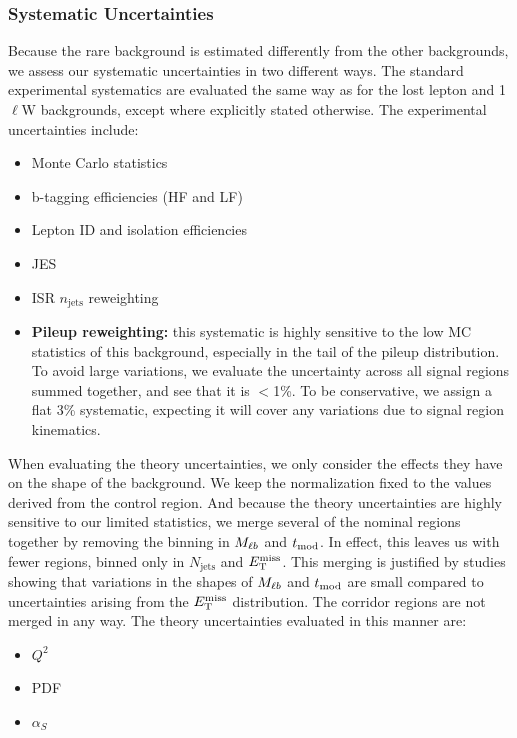 \subsubsection{Systematic Uncertainties}
\label{sssec:stop:rarebkg:systematics}

Because the rare background is estimated differently from the other
backgrounds, we assess our systematic uncertainties in two different
ways. The standard experimental systematics are evaluated the same way
as for the lost lepton and 1$\ell$W backgrounds, except where
explicitly stated otherwise. The experimental uncertainties include:
\begin{itemize}
\item Monte Carlo statistics
\item b-tagging efficiencies (HF and LF)
\item Lepton ID and isolation efficiencies
\item JES
\item ISR $n_\text{jets}$ reweighting
\item \textbf{Pileup reweighting:} this systematic is highly sensitive to the
  low MC statistics of this background, especially in the tail of the
  pileup distribution. To avoid large variations, we evaluate the
  uncertainty across all signal regions summed together, and see that
  it is $<$1\%. To be conservative, we assign a flat 3\% systematic,
  expecting it will cover any variations due to signal region kinematics.
\end{itemize}

When evaluating the theory uncertainties, we only consider the effects
they have on the shape of the background. We keep the normalization
fixed to the values derived from the control region. And because the
theory uncertainties are highly sensitive to our limited statistics,
we merge several of the nominal regions together by removing the
binning in $M_{\ell b}$ and $t_\text{mod}$. In effect, this leaves us
with fewer regions, binned only in $N_\text{jets}$ and $E_\text{T}^\text{miss}$. This
merging is justified by studies showing that variations in the shapes
of $M_{\ell b}$ and $t_\text{mod}$ are small compared to uncertainties arising from
the $E_\text{T}^\text{miss}$ distribution. The corridor regions are not merged in any
way. The theory uncertainties evaluated in this manner are:
\begin{itemize}
\item $Q^2$
\item PDF
\item $\alpha_S$
\end{itemize}

